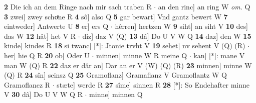 \documentclass[8pt,a4paper,notitlepage]{article}
\begin{document}
\begin{table}[ht]
\begin{minipage}[t]{0.5\linewidth}
\textbf{2} Die ich an dem Ringe nach mir sach traben R  $\cdot$ an den rinc] an ring W \textit{om.} Q \textbf{3} zwei] zwey schoͯne R \textbf{4} sô] also Q \textbf{5} gar bewart] Vnd gantz bewert W \textbf{7} eintweder] Antwerte U \textbf{8} er] ers Q  $\cdot$ hêrren] hertzen W \textbf{9} siht] an siht V \textbf{10} des] das W \textbf{12} hât] het V R  $\cdot$ diz] daz V (Q) \textbf{13} dâ] Do U V W Q \textbf{14} daz] den W \textbf{15} kinde] kindes R \textbf{18} si twanc] [*]: Jtonie trvht V \textbf{19} sehet] nv sehent V (Q) (R)  $\cdot$ her] hie Q R \textbf{20} ob] Oder U  $\cdot$ minnen] minne W R meine Q  $\cdot$ kan] [*]: mane V man W (Q) R \textbf{22} daz er dâr an] Dar an er V (W) (Q) (R) \textbf{23} minnen] minne W (Q) R \textbf{24} sîn] seinsz Q \textbf{25} Gramoflanz] Gramaflanz V Gramoflantz W Q Gramoflancz R  $\cdot$ stæte] werde R \textbf{27} sîme] sinnen R \textbf{28} [*]: So Endehafter minne V \textbf{30} dâ] Do U V W Q R  $\cdot$ minne] minnen Q \newline
\end{minipage}
\end{table}
\end{document}
